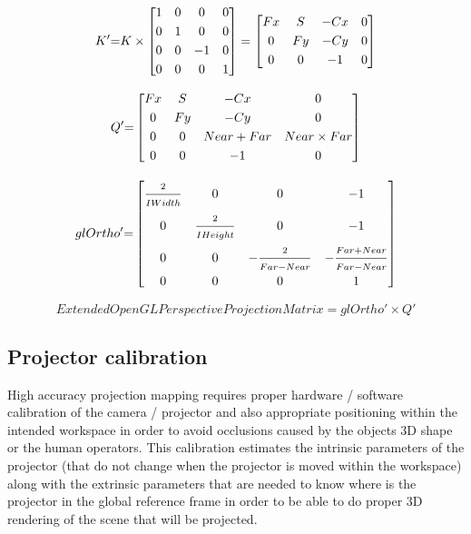 {	\begin{equation}\label{eq:k2}
		K'{=}
		K
		\times
		\begin{bmatrix}
		1 & 0 & 0 & 0 \\[\smallskipamount]
		0 & 1 & 0 & 0 \\[\smallskipamount]
		0 & 0 & -1 & 0 \\[\smallskipamount]
		0 & 0 & 0 & 1
		\end{bmatrix}
		=
		\begin{bmatrix}
		Fx & S & -Cx & 0 \\[\smallskipamount]
		0 & Fy & -Cy & 0 \\[\smallskipamount]
		0 & 0 & -1 & 0
		\end{bmatrix}
	\end{equation}

	\begin{equation}\label{eq:q2}
		Q'{=}
		\begin{bmatrix}
			Fx & S & -Cx & 0 \\[\smallskipamount]
			0 & Fy & -Cy & 0 \\[\smallskipamount]
			0 & 0 & Near + Far & Near \times Far \\[\smallskipamount]
			0 & 0 & -1 & 0
		\end{bmatrix}
	\end{equation}

	\begin{equation}\label{eq:glOrtho2}
		glOrtho'{=}
		\begin{bmatrix}
			\vfrac{2}{IWidth} & 0 & 0 & -1 \\[\smallskipamount]
			0 & \vfrac{2}{IHeight} & 0 & -1 \\[\smallskipamount]
			0 & 0 & -\vfrac{2}{Far - Near} & -\vfrac{Far + Near}{Far - Near} \\[\smallskipamount]
			0 & 0 & 0 & 1
		\end{bmatrix}
	\end{equation}

	\begin{equation}\label{eq:projection-matrix}
		ExtendedOpenGLPerspectiveProjectionMatrix = glOrtho' \times Q'
	\end{equation}
}%


\subsection{Projector calibration}

High accuracy projection mapping requires proper hardware / software calibration of the camera / projector and also appropriate positioning within the intended workspace in order to avoid occlusions caused by the objects 3D shape or the human operators. This calibration estimates the intrinsic parameters of the projector (that do not change when the projector is moved within the workspace) along with the extrinsic parameters that are needed to know where is the projector in the global reference frame in order to be able to do proper 3D rendering of the scene that will be projected.

